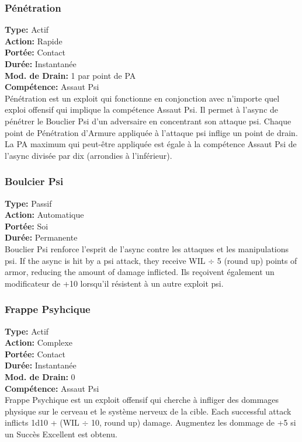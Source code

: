 \subsubsection{Pénétration} \textbf{Type:} Actif \\ \textbf{Action:} Rapide \\ \textbf{Portée:} Contact \\ \textbf{Durée:} Instantanée \\ \textbf{Mod. de Drain:} 1 par point de PA \\ \textbf{Compétence:} Assaut Psi \\ Pénétration est un exploit qui fonctionne en conjonction avec n'importe quel exploi offensif qui implique la compétence Assaut Psi. Il permet à l'async de pénétrer le Bouclier Psi d'un adversaire en concentrant son attaque psi. Chaque point de Pénétration d'Armure appliquée à l'attaque psi inflige un point de drain. La PA maximum qui peut-être appliquée est égale à la compétence Assaut Psi de l'async divisée par dix (arrondies à l'inférieur). 

\subsubsection{Boulcier Psi} \textbf{Type:} Passif \\ \textbf{Action:} Automatique \\ \textbf{Portée:} Soi \\ \textbf{Durée:} Permanente \\ Bouclier Psi renforce l'esprit de l'async contre les attaques et les manipulations psi. If the async is hit by a psi attack, they receive WIL $\div$ 5 (round up) points of armor, reducing the amount of damage inflicted. Ils reçoivent également un modificateur de +10 lorsqu'il résistent à un autre exploit psi. 

\subsubsection{Frappe Psyhcique} \textbf{Type:} Actif \\ \textbf{Action:} Complexe \\ \textbf{Portée:} Contact \\ \textbf{Durée:} Instantanée \\ \textbf{Mod. de Drain:} 0 \\ \textbf{Compétence:} Assaut Psi \\ Frappe Psychique est un exploit offensif qui cherche à infliger des dommages physique sur le cerveau et le système nerveux de la cible. Each successful attack inflicts 1d10 + (WIL $\div$ 10, round up) damage. Augmentez les dommage de +5 si un Succès Excellent est obtenu. 

